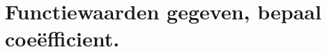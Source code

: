 \documentclass[examenvragen.tex]{subfiles}
\begin{document}
\section{Functiewaarden gegeven, bepaal coe\"efficient.}
\end{document}
